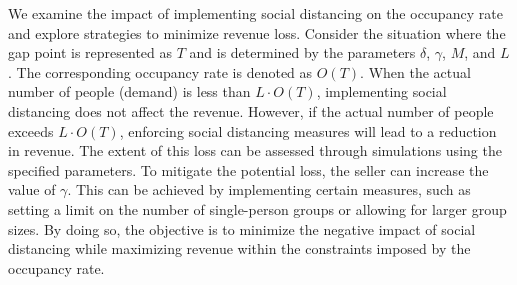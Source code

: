 We examine the impact of implementing social distancing on the occupancy rate and explore strategies to minimize revenue loss. Consider the situation where the gap point is represented as $T$ and is determined by the parameters $\delta$, $\gamma$, $M$, and $L$. The corresponding occupancy rate is denoted as $O(T)$. When the actual number of people (demand) is less than $L \cdot O(T)$, implementing social distancing does not affect the revenue. However, if the actual number of people exceeds $L \cdot O(T)$, enforcing social distancing measures will lead to a reduction in revenue. The extent of this loss can be assessed through simulations using the specified parameters. To mitigate the potential loss, the seller can increase the value of $\gamma$. This can be achieved by implementing certain measures, such as setting a limit on the number of single-person groups or allowing for larger group sizes. By doing so, the objective is to minimize the negative impact of social distancing while maximizing revenue within the constraints imposed by the occupancy rate.






